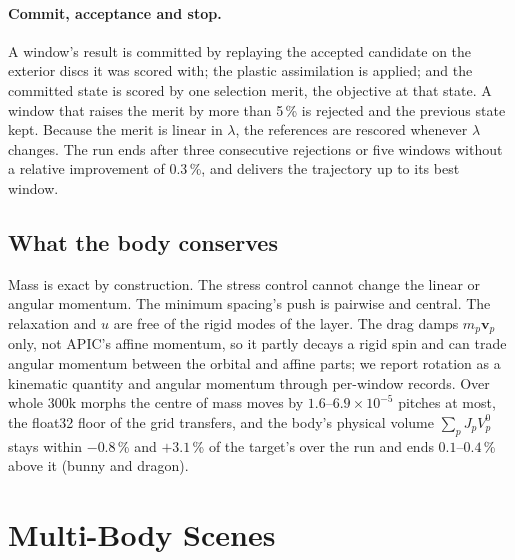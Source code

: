 \paragraph{Commit, acceptance and stop.} A window's result is committed by replaying the accepted candidate on the
exterior discs it was scored with; the plastic assimilation is applied; and the committed state is scored by one
selection merit, the objective at that state. A window that raises the merit by more than 5\,\% is rejected and the
previous state kept. Because the merit is linear in $\lambda$, the references are rescored whenever $\lambda$ changes.
The run ends after three consecutive rejections or five windows without a relative improvement of 0.3\,\%, and
delivers the trajectory up to its best window.

\subsection{What the body conserves}
\label{ch4:sec_conservation}
Mass is exact by construction. The stress control cannot change the linear or angular momentum. The minimum
spacing's push is pairwise and central. The relaxation and $u$ are free of the rigid modes of the layer. The
drag damps $m_p\mathbf{v}_p$ only, not APIC's affine momentum, so it partly decays a rigid spin and can trade angular
momentum between the orbital and affine parts; we report rotation as a kinematic quantity and angular momentum through
per-window records. Over whole 300k morphs the centre of mass moves by $1.6$--$6.9\times10^{-5}$ pitches at most, the
float32 floor of the grid transfers, and the body's physical volume $\sum_p J_pV^0_p$ stays within $-0.8$\,\% and
$+3.1$\,\% of the target's over the run and ends $0.1$--$0.4$\,\% above it (bunny and dragon).

\section{Multi-Body Scenes}
\label{ch4:sec_scene}

